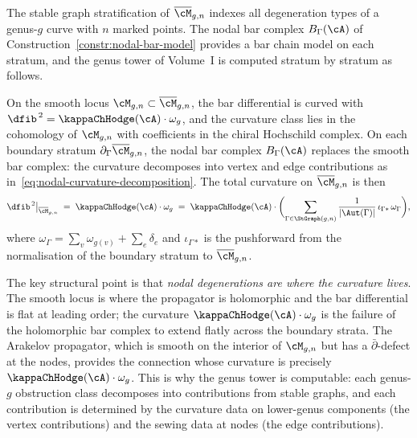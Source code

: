 \begin{remark}%
\label{rem:stable-graph-genus-tower}%
%
%
The stable graph stratification of $\overline{\cM}_{g,n}$ indexes
all degeneration types of a genus-$g$ curve with $n$ marked
points. The nodal bar complex
$B_\Gamma(\cA)$ of
Construction~\ref{constr:nodal-bar-model} provides a bar chain
model on each stratum, and the genus tower of Volume~I is computed
stratum by stratum as follows.

On the smooth locus $\cM_{g,n}\subset\overline{\cM}_{g,n}$,
the bar differential is curved with
$\dfib^{\,2} = \kappaChHodge(\cA)\cdot\omega_g$, and the curvature
class lies in the cohomology of $\cM_{g,n}$ with coefficients
in the chiral Hochschild complex. On each boundary stratum
$\partial_\Gamma\overline{\cM}_{g,n}$, the nodal bar complex
$B_\Gamma(\cA)$ replaces the smooth bar complex: the curvature
decomposes into vertex and edge contributions as
in~\eqref{eq:nodal-curvature-decomposition}. The total curvature
on $\overline{\cM}_{g,n}$ is then
\[
 \dfib^{\,2}\big|_{\overline{\cM}_{g,n}}
 \;=\;
 \kappaChHodge(\cA)\cdot\omega_g
 \;=\;
 \kappaChHodge(\cA)\cdot
 \biggl(
 \sum_{\Gamma\in\StGraph(g,n)}
 \frac{1}{|\Aut(\Gamma)|}
 \,\iota_{\Gamma*}\,
 \omega_\Gamma
 \biggr),
\]
where $\omega_\Gamma = \sum_v \omega_{g(v)} + \sum_e \delta_e$
and $\iota_{\Gamma*}$ is the pushforward from the normalisation
of the boundary stratum to $\overline{\cM}_{g,n}$.

The key structural point is that
\emph{nodal degenerations are where the curvature lives}. The
smooth locus is where the propagator is holomorphic and the
bar differential is flat at leading order; the curvature
$\kappaChHodge(\cA)\cdot\omega_g$ is the failure of the
holomorphic bar complex to extend flatly across the boundary
strata. The Arakelov propagator, which is smooth on the
interior of $\cM_{g,n}$ but has a $\bar\partial$-defect at the
nodes, provides the connection whose curvature is precisely
$\kappaChHodge(\cA)\cdot\omega_g$. This is why the genus tower is
computable: each genus-$g$ obstruction class decomposes into
contributions from stable graphs, and each contribution is
determined by the curvature data on lower-genus components
(the vertex contributions) and the sewing data at nodes
(the edge contributions).
\end{remark}

